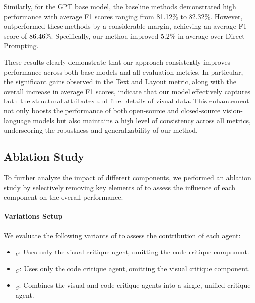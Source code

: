 Similarly, for the GPT base model, the baseline methods demonstrated high performance with average F1 scores ranging from 81.12\% to 82.32\%. However, \model{} outperformed these methods by a considerable margin, achieving an average F1 score of 86.46\%. Specifically, our method improved 5.2\% in average over Direct Prompting.

These results clearly demonstrate that our approach consistently improves performance across both base models and all evaluation metrics. In particular, the significant gains observed in the Text and Layout metric, along with the overall increase in average F1 scores, indicate that our model effectively captures both the structural attributes and finer details of visual data. This enhancement not only boosts the performance of both open-source and closed-source vision-language models but also maintains a high level of consistency across all metrics, underscoring the robustness and generalizability of our method.



\subsection{Ablation Study}
\label{sec:ablation_study}
To further analyze the impact of different components, we performed an ablation study by selectively removing key elements of \model{} to assess the influence of each component on the overall performance.


\paragraph{Variations Setup}
We evaluate the following variants of \model{} to assess the contribution of each agent:

\begin{itemize}
    \setlength{\itemsep}{0pt}
    \setlength{\parsep}{0pt}
    \setlength{\topsep}{0pt}
    \item \model{}$_V$: Uses only the visual critique agent, omitting the code critique component.
    \item \model{}$_C$: Uses only the code critique agent, omitting the visual critique component.
    \item \model{}$_S$: Combines the visual and code critique agents into a single, unified critique agent.
\end{itemize}

